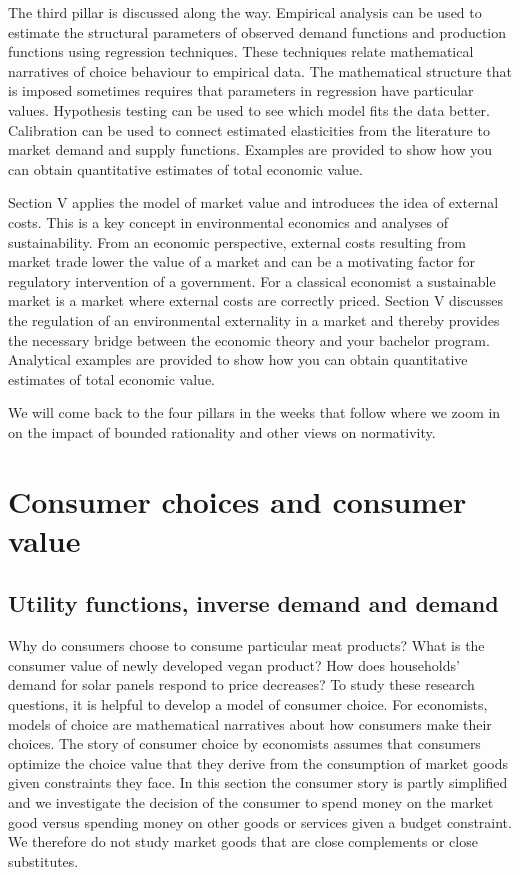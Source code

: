\documentclass[
]{book}
\begin{document}
The third pillar is discussed along the way. Empirical analysis can be used to estimate the structural parameters of observed demand functions and production functions using regression techniques. These techniques relate mathematical narratives of choice behaviour to empirical data. The mathematical structure that is imposed sometimes requires that parameters in regression have particular values. Hypothesis testing can be used to see which model fits the data better. Calibration can be used to connect estimated elasticities from the literature to market demand and supply functions. Examples are provided to show how you can obtain quantitative estimates of total economic value.

Section V applies the model of market value and introduces the idea of external costs. This is a key concept in environmental economics and analyses of sustainability. From an economic perspective, external costs resulting from market trade lower the value of a market and can be a motivating factor for regulatory intervention of a government. For a classical economist a sustainable market is a market where external costs are correctly priced. Section V discusses the regulation of an environmental externality in a market and thereby provides the necessary bridge between the economic theory and your bachelor program. Analytical examples are provided to show how you can obtain quantitative estimates of total economic value.

We will come back to the four pillars in the weeks that follow where we zoom in on the impact of bounded rationality and other views on normativity.

\hypertarget{consumer-choices-and-consumer-value}{%
\section{Consumer choices and consumer value}\label{consumer-choices-and-consumer-value}}

\hypertarget{utility-functions-inverse-demand-and-demand}{%
\subsection{Utility functions, inverse demand and demand}\label{utility-functions-inverse-demand-and-demand}}

Why do consumers choose to consume particular meat products? What is the consumer value of newly developed vegan product? How does households' demand for solar panels respond to price decreases? To study these research questions, it is helpful to develop a model of consumer choice. For economists, models of choice are mathematical narratives about how consumers make their choices. The story of consumer choice by economists assumes that consumers optimize the choice value that they derive from the consumption of market goods given constraints they face. In this section the consumer story is partly simplified and we investigate the decision of the consumer to spend money on the market good versus spending money on other goods or services given a budget constraint. We therefore do not study market goods that are close complements or close substitutes.
\end{document}
